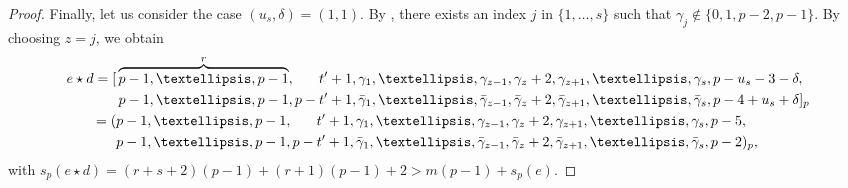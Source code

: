 \documentclass[10pt,a4paper]{amsart}
\newcommand{\comp}[1]{\bar{#1}}
\newcommand{\wt}{s_p}
\begin{document}
\begin{proof}
Finally, let us consider the case $(u_s,\delta) = (1,1)$. By , there exists an index $j$ in $\{1,\dots,s\}$ such that $\gamma_j \notin\{0,1,p-2,p-1\}$. By choosing $z = j$, we obtain
\begin{align*}
e \star d = [&\overbrace{p-1,\dots,p-1}^r,\hphantom{p - }\,\;t'+1,\gamma_1,\dots,\gamma_{z-1},\gamma_z + 2, \gamma_{z+1},\dots,\gamma_s, p-u_s-3-\delta,\\ &\,p-1,\dots,p-1,p-t'+1, \comp{\gamma}_1,\dots,\comp{\gamma}_{z-1},\comp{\gamma}_{z}+2,\comp{\gamma}_{z+1},\dots,\comp{\gamma}_s,p-4+u_s+\delta]_p \\
= (&p-1,\dots,p-1,\phantom{p - }\,\;t'+1,\gamma_1,\dots,\gamma_{z-1},\gamma_z + 2, \gamma_{z+1},\dots,\gamma_s, p-5,\\ &p-1,\dots,p-1,p-t'+1, \comp{\gamma}_1,\dots,\comp{\gamma}_{z-1},\comp{\gamma}_{z}+2, \comp{\gamma}_{z+1},\dots,\comp{\gamma}_s,p-2)_p,
\end{align*}
with $\wt(e \star d) = (r+s+2)(p-1)+ (r+1)(p-1) + 2 > m(p - 1) + \wt(e)$.
\end{proof}
\end{document}
